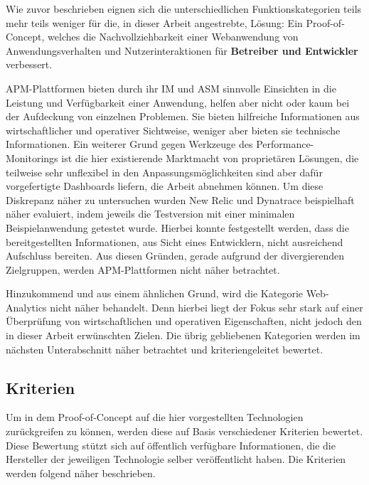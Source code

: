 Wie zuvor beschrieben eignen sich die unterschiedlichen Funktionskategorien teils mehr teils weniger für die, in dieser Arbeit angestrebte, Lösung: Ein Proof-of-Concept, welches die Nachvollziehbarkeit einer Webanwendung von Anwendungsverhalten und Nutzerinteraktionen für \textbf{Betreiber und Entwickler} verbessert.

APM-Plattformen bieten durch ihr IM und ASM sinnvolle Einsichten in die Leistung und Verfügbarkeit einer Anwendung, helfen aber nicht oder kaum bei der Aufdeckung von einzelnen Problemen. Sie bieten hilfreiche Informationen aus wirtschaftlicher und operativer Sichtweise, weniger aber bieten sie technische Informationen. Ein weiterer Grund gegen Werkzeuge des Performance-Monitorings ist die hier existierende Marktmacht von proprietären Lösungen, die teilweise sehr unflexibel in den Anpassungsmöglichkeiten sind aber dafür vorgefertigte Dashboards liefern, die Arbeit abnehmen können. Um diese Diskrepanz näher zu untersuchen wurden New Relic und Dynatrace beispielhaft näher evaluiert, indem jeweils die Testversion mit einer minimalen Beispielanwendung getestet wurde. Hierbei konnte festgestellt werden, dass die bereitgestellten Informationen, aus Sicht eines Entwicklern, nicht ausreichend Aufschluss bereiten. Aus diesen Gründen, gerade aufgrund der divergierenden Zielgruppen, werden APM-Plattformen nicht näher betrachtet.

Hinzukommend und aus einem ähnlichen Grund, wird die Kategorie Web-Analytics nicht näher behandelt. Denn hierbei liegt der Fokus sehr stark auf einer Überprüfung von wirtschaftlichen und operativen Eigenschaften, nicht jedoch den in dieser Arbeit erwünschten Zielen. Die übrig gebliebenen Kategorien werden im nächsten Unterabschnitt näher betrachtet und kriteriengeleitet bewertet.

\subsection{Kriterien}

Um in dem Proof-of-Concept auf die hier vorgestellten Technologien zurückgreifen zu können, werden diese auf Basis verschiedener Kriterien bewertet. Diese Bewertung stützt sich auf öffentlich verfügbare Informationen, die die Hersteller der jeweiligen Technologie selber veröffentlicht haben. Die Kriterien werden folgend näher beschrieben.

